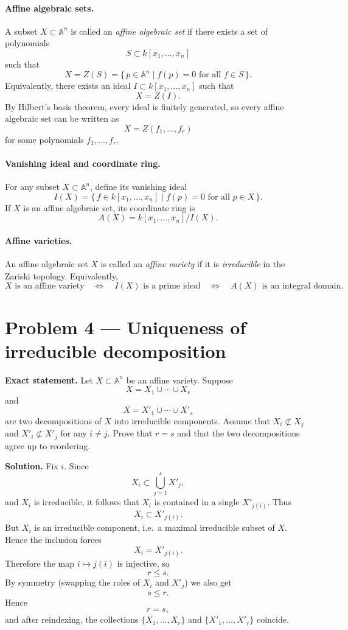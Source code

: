 \documentclass[12pt,a4paper]{article}
\theoremstyle{plain}
\theoremstyle{definition}      %
\begin{document}
\paragraph{Affine algebraic sets.}
A subset $X\subset \mathbb A^n$ is called an \emph{affine algebraic set} if there exists a set of polynomials
\[
S\subset k[x_1,\dots,x_n]
\]
such that
\[
X
=
Z(S)
=
\{\,p\in \mathbb A^n \mid f(p)=0 \text{ for all } f\in S\,\}.
\]
Equivalently, there exists an ideal $I\subset k[x_1,\dots,x_n]$ such that
\[
X
=
Z(I).
\]
By Hilbert's basis theorem, every ideal is finitely generated, so every affine algebraic set can be written as
\[
X
=
Z(f_1,\dots,f_r)
\]
for some polynomials $f_1,\dots,f_r$.

\paragraph{Vanishing ideal and coordinate ring.}
For any subset $X\subset \mathbb A^n$, define its vanishing ideal
\[
I(X)
=
\{\,f\in k[x_1,\dots,x_n]\mid f(p)=0 \text{ for all } p\in X\,\}.
\]
If $X$ is an affine algebraic set, its coordinate ring is
\[
A(X)
=
k[x_1,\dots,x_n]/I(X).
\]

\paragraph{Affine varieties.}
An affine algebraic set $X$ is called an \emph{affine variety} if it is \emph{irreducible} in the Zariski topology.
Equivalently,
\[
X \text{ is an affine variety}
\quad\Longleftrightarrow\quad
I(X) \text{ is a prime ideal}
\quad\Longleftrightarrow\quad
A(X) \text{ is an integral domain}.
\]


\section*{Problem 4 — Uniqueness of irreducible decomposition}

\textbf{Exact statement.}
Let $X\subset \mathbb A^n$ be an affine variety.
Suppose
\[
X
=
X_1\cup\cdots\cup X_r
\]
and
\[
X
=
X'_1\cup\cdots\cup X'_s
\]
are two decompositions of $X$ into irreducible components.
Assume that $X_i\not\subset X_j$ and $X'_i\not\subset X'_j$ for any $i\neq j$.
Prove that $r=s$ and that the two decompositions agree up to reordering.

\textbf{Solution.}
Fix $i$.
Since
\[
X_i
\subset
\bigcup_{j=1}^s
X'_j,
\]
and $X_i$ is irreducible, it follows that $X_i$ is contained in a single $X'_{j(i)}$.
Thus
\[
X_i
\subset
X'_{j(i)}.
\]
But $X_i$ is an irreducible component, i.e.\ a maximal irreducible subset of $X$.
Hence the inclusion forces
\[
X_i
=
X'_{j(i)}.
\]
Therefore the map $i\mapsto j(i)$ is injective, so
\[
r\le s.
\]
By symmetry (swapping the roles of $X_i$ and $X'_j$) we also get
\[
s\le r.
\]
Hence
\[
r=s,
\]
and after reindexing, the collections $\{X_1,\dots,X_r\}$ and $\{X'_1,\dots,X'_r\}$ coincide.
\end{document}
